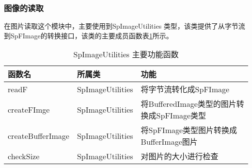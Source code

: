 \subsubsection{图像的读取}
在图片读取这个模块中，主要使用到SpImageUtilities 类型，该类提供了从字节流到SpFImage的转换接口，该类的主要成员函数表\ref{tab:SpImageUtilities_function}所示。
\begin{table}[h] %
\caption{SpImageUtilities 主要功能函数} %
\centering
\label{tab:SpImageUtilities_function}
\begin{tabular}{p{3cm}|p{3cm}|p{6cm}} %
\hline
\hline
函数名  & 所属类 & 功能 \\ %
\hline %
readF  & SpImageUtilities & 将字节流转化成SpFImage\\
\hline
createFImge  & SpImageUtilities & 将BufferedImage类型的图片转换成SpFImage类型\\
\hline
createBufferImage & SpImageUtilities & 将SpFImage类型图片转换成BufferImage图片\\
\hline
checkSize  & SpImageUtilities & 对图片的大小进行检查\\
\hline
\hline
\end{tabular}
\end{table}

